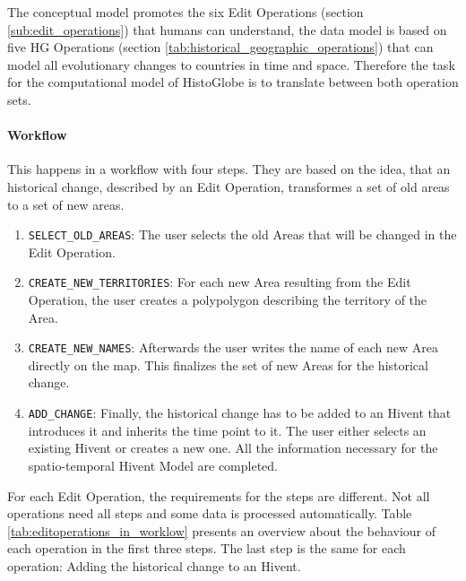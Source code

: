 The conceptual model promotes the six Edit Operations (section \ref{sub:edit_operations}) that humans can understand, the data model is based on five HG Operations (section \ref{tab:historical_geographic_operations}) that can model all evolutionary changes to countries in time and space. Therefore the task for the computational model of HistoGlobe is to translate between both operation sets.


\paragraph{Workflow} %
\label{par:workflow}

This happens in a workflow with four steps. They are based on the idea, that an historical change, described by an Edit Operation, transformes a set of old areas to a set of new areas.

\begin{enumerate}
  \item \texttt{SELECT\_OLD\_AREAS}: The user selects the old Areas that will be changed in the Edit Operation.
  \item \texttt{CREATE\_NEW\_TERRITORIES}: For each new Area resulting from the Edit Operation, the user creates a polypolygon describing the territory of the Area.
  \item \texttt{CREATE\_NEW\_NAMES}: Afterwards the user writes the name of each new Area directly on the map. This finalizes the set of new Areas for the historical change.
  \item \texttt{ADD\_CHANGE}: Finally, the historical change has to be added to an Hivent that introduces it and inherits the time point to it. The user either selects an existing Hivent or creates a new one. All the information necessary for the spatio-temporal Hivent Model are completed.
\end{enumerate}

For each Edit Operation, the requirements for the steps are different. Not all operations need all steps and some data is processed automatically. Table \ref{tab:editoperations_in_worklow} presents an overview about the behaviour of each operation in the first three steps. The last step is the same for each operation: Adding the historical change to an Hivent.

